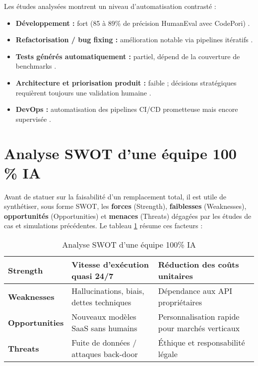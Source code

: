 Les études analysées montrent un niveau d’automatisation contrasté :  
\begin{itemize}
  \item \textbf{Développement :} fort (85 à 89\% de précision HumanEval avec CodePori) \parencite{rasheed_codepori_2024}.  
  \item \textbf{Refactorisation / bug fixing :} amélioration notable via pipelines itératifs \parencite{vallecillos_ruiz_agent-driven_2024}.  
  \item \textbf{Tests générés automatiquement :} partiel, dépend de la couverture de benchmarks \parencite{abbas_ai-driven_2024}.  
  \item \textbf{Architecture et priorisation produit :} faible ; décisions stratégiques requièrent toujours une validation humaine \parencite{handler_taxonomy_2023}.  
  \item \textbf{DevOps :} automatisation des pipelines CI/CD prometteuse mais encore supervisée \parencite{khan_ai-driven_2025}.
\end{itemize}

\section{Analyse SWOT d’une équipe 100 \% IA}

Avant de statuer sur la faisabilité d’un remplacement total, il est utile de synthétiser, sous forme SWOT, les \textbf{forces} (Strength), \textbf{faiblesses} (Weaknesses), \textbf{opportunités} (Opportunities) et \textbf{menaces} (Threats) dégagées par les études de cas et simulations précédentes.  
Le tableau \ref{tab:SWOT} résume ces facteurs :

\begin{table}[H]
    \begin{tabular}{|p{2.5cm}|p{6cm}|p{6cm}|}
        \hline
        \textbf{Strength} & Vitesse d'exécution quasi 24/7 \parencite{ashraf_autonomous_2025} & Réduction des coûts unitaires \parencite{rasheed_codepori_2024} \\
        \hline
        \textbf{Weaknesses} & Hallucinations, biais, dettes techniques \parencite{cui_risk_2024} & Dépendance aux API propriétaires \parencite{rasheed_codepori_2024}\\
        \hline
        \textbf{Opportunities} & Nouveaux modèles SaaS sans humains & Personnalisation rapide pour marchés verticaux \\
        \hline
        \textbf{Threats} & Fuite de données / attaques back-door \parencite{wang_unique_2024} & Éthique et responsabilité légale \\
        \hline
    \end{tabular}
    \caption{Analyse SWOT d'une équipe 100\% IA}
    \label{tab:SWOT}
\end{table}

